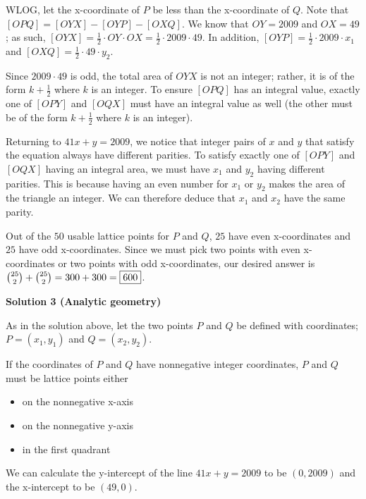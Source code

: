 \begin{enumerate}
 


 WLOG, let the x-coordinate of $P$ be less than the x-coordinate of $Q$. Note that $[OPQ]=[OYX]-[OYP]-[OXQ]$. We know that $OY=2009$ and $OX= 49$; as such, $[OYX]=\frac{1}{2} \cdot OY \cdot OX = \frac{1}{2} \cdot 2009 \cdot 49$. In addition, $[OYP]=\frac{1}{2} \cdot 2009 \cdot x_1$ and $[OXQ]=\frac{1}{2} \cdot 49 \cdot y_2$. 

 
Since $2009 \cdot 49$ is odd, the total area of $OYX$ is not an integer; rather, it is of the form $k + \frac{1}{2}$ where $k$ is an integer. To ensure $[OPQ]$ has an integral value, exactly one of $[OPY]$ and $[OQX]$ must have an integral value as well (the other must be of the form $k + \frac{1}{2}$ where $k$ is an integer).

 
Returning to $41x+y=2009$, we notice that integer pairs of $x$ and $y$ that satisfy the equation always have different parities. To satisfy exactly one of $[OPY]$ and $[OQX]$ having an integral area, we must have $x_1$ and $y_2$ having different parities. This is because having an even number for $x_1$ or $y_2$ makes the area of the triangle an integer. We can therefore deduce that $x_1$ and $x_2$ have the same parity. 

 Out of the $50$ usable lattice points for $P$ and $Q$, $25$ have even x-coordinates and $25$ have odd x-coordinates. Since we must pick two points with even x-coordinates or two points with odd x-coordinates, our desired answer is $\binom{25}{2}+\binom{25}{2}=300+300=\fbox{600}$.

 



\textbf{Solution 3 (Analytic geometry)}

As in the solution above, let the two points $P$ and $Q$ be defined with coordinates; $P=(x_1,y_1)$ and $Q=(x_2,y_2)$.

 
If the coordinates of $P$ and $Q$ have nonnegative integer coordinates, $P$ and $Q$ must be lattice points either

 
            \begin{itemize}
        \item on the nonnegative x-axis
            \end{itemize}
            
            \begin{itemize}
        \item on the nonnegative y-axis
            \end{itemize}
            
            \begin{itemize}
        \item in the first quadrant
            \end{itemize}
            We can calculate the y-intercept of the line $41x+y=2009$ to be $(0,2009)$ and the x-intercept to be $(49,0)$.


\end{enumerate}
